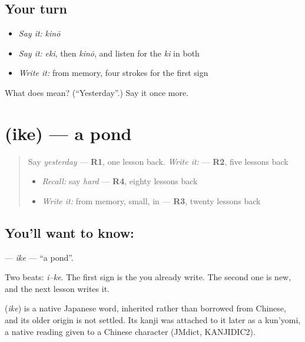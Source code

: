 \subsection*{Your turn}
\begin{itemize}
\raggedright
  \item \emph{Say it:} \emph{kinō}
  \item \emph{Say it:} \emph{eki}, then \emph{kinō}, and listen for the \emph{ki} in both
  \item \emph{Write it:} \textbf{} from memory, four strokes for the first sign
\end{itemize}

\begin{tcolorbox}[breakable,colback=teal!4,colframe=teal!35!black,title={Before you move on}]
What does  mean? (\textquotedblleft{}Yesterday\textquotedblright{}.) Say it once more.
\end{tcolorbox}
\section[\texorpdfstring{\ja{いけ} (ike)}{いけ (ike)}]{ (ike) — a pond}

\label{lesson:JA-C133-ike}



\begin{quote}
Say \emph{yesterday} — \textbf{R1}, one lesson back. \emph{Write it:} \textbf{} — \textbf{R2}, five lessons back

\begin{itemize}
\raggedright
  \item \emph{Recall:} say \emph{hard} — \textbf{R4}, eighty lessons back
  \item \emph{Write it:} \textbf{} from memory, small, in \textbf{} — \textbf{R3}, twenty lessons back
\end{itemize}
\end{quote}

\subsection*{You'll want to know: }
\textbf{} — \emph{ike} — \textquotedblleft{}a pond\textquotedblright{}.

Two beats: \emph{i–ke}. The first sign is the \textbf{} you already write. The second one is new, and the next lesson writes it.

\begin{cousinweb}
\textbf{} (\emph{ike}) is a native Japanese word, inherited rather than borrowed from Chinese, and its older origin is not settled. Its kanji was attached to it later as a kun'yomi, a native reading given to a Chinese character (JMdict, KANJIDIC2).
\end{cousinweb}

